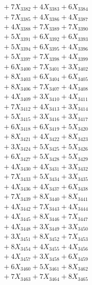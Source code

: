 \documentclass[a4paper,10pt]{article}
\begin{document}
{\begin{align}
&\;  + 7 X_{3382} + 4 X_{3383} + 6 X_{3384} \\[0.3ex]
&\;  + 7 X_{3385} + 4 X_{3386} + 4 X_{3387} \\[0.3ex]
&\;  + 4 X_{3388} + 7 X_{3389} + 7 X_{3390} \\[0.3ex]
&\;  + 5 X_{3391} + 6 X_{3392} + 6 X_{3393} \\[0.3ex]
&\;  + 5 X_{3394} + 6 X_{3395} + 4 X_{3396} \\[0.3ex]
&\;  + 5 X_{3397} + 7 X_{3398} + 4 X_{3399} \\[0.5ex]\allowbreak
&\;  + 6 X_{3400} + 7 X_{3401} + 3 X_{3402} \\[0.3ex]
&\;  + 8 X_{3403} + 6 X_{3404} + 6 X_{3405} \\[0.3ex]
&\;  + 8 X_{3406} + 7 X_{3407} + 4 X_{3408} \\[0.3ex]
&\;  + 4 X_{3409} + 3 X_{3410} + 4 X_{3411} \\[0.3ex]
&\;  + 7 X_{3412} + 4 X_{3413} + 3 X_{3414} \\[0.3ex]
&\;  + 5 X_{3415} + 3 X_{3416} + 3 X_{3417} \\[0.3ex]
&\;  + 6 X_{3418} + 6 X_{3419} + 5 X_{3420} \\[0.3ex]
&\;  + 8 X_{3421} + 4 X_{3422} + 8 X_{3423} \\[0.3ex]
&\;  + 3 X_{3424} + 5 X_{3425} + 5 X_{3426} \\[0.3ex]
&\;  + 6 X_{3427} + 5 X_{3428} + 5 X_{3429} \\[0.5ex]\allowbreak
&\;  + 4 X_{3430} + 4 X_{3431} + 3 X_{3432} \\[0.3ex]
&\;  + 7 X_{3433} + 5 X_{3434} + 3 X_{3435} \\[0.3ex]
&\;  + 4 X_{3436} + 4 X_{3437} + 6 X_{3438} \\[0.3ex]
&\;  + 7 X_{3439} + 8 X_{3440} + 8 X_{3441} \\[0.3ex]
&\;  + 4 X_{3442} + 7 X_{3443} + 4 X_{3444} \\[0.3ex]
&\;  + 4 X_{3445} + 8 X_{3446} + 7 X_{3447} \\[0.3ex]
&\;  + 4 X_{3448} + 3 X_{3449} + 3 X_{3450} \\[0.3ex]
&\;  + 3 X_{3451} + 8 X_{3452} + 7 X_{3453} \\[0.3ex]
&\;  + 8 X_{3454} + 4 X_{3455} + 4 X_{3456} \\[0.3ex]
&\;  + 4 X_{3457} + 3 X_{3458} + 6 X_{3459} \\[0.5ex]\allowbreak
&\;  + 6 X_{3460} + 5 X_{3461} + 8 X_{3462} \\[0.3ex]
&\;  + 7 X_{3463} + 7 X_{3464} + 8 X_{3465} \\[0.3ex]

\end{align}}
\end{document}
